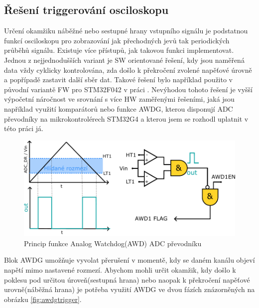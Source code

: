 \subsection{Řešení triggerování osciloskopu}
Určení okamžiku náběžné nebo sestupné hrany vstupního signálu je podstatnou funkcí osciloskopu pro zobrazování jak přechodných jevů tak periodických průběhů signálu. Existuje více přístupů, jak takovou funkci implementovat. Jednou z nejjednodušších variant je SW orientované řešení, kdy  jsou naměřená data vždy cyklicky kontrolována, zda došlo k překročení zvolené napěťové úrovně a popřípadě zastavit další sběr dat. Takové řešení bylo například použito v původní variantě FW pro STM32F042 v práci \cite{BerlingerDIP}. Nevýhodou tohoto řešení je vyšší výpočetní náročnost ve srovnání s více HW zaměřenými řešeními, jaká jsou například využití komparátorů nebo funkce AWDG, kterou disponují ADC převodníky na mikrokontrolérech STM32G4 a kterou jsem se rozhodl uplatnit v této práci já.\\

\begin{figure}[H]
	\centering
	\includegraphics[width=0.9\linewidth]{Figs/Diagrams/SVG/AWD_function.pdf}
	\caption{Princip funkce Analog Watchdog(AWD) ADC převodníku}
	\label{fig:AWD_function}
\end{figure}

Blok AWDG umožňuje vyvolat přerušení v momentě, kdy se daném kanálu objeví napětí mimo nastavené rozmezí. Abychom mohli určit okamžik, kdy došlo k poklesu pod určitou úroveň(sestupná hrana) nebo naopak k překročení napěťové urovně(náběžná hrana) je potřeba využití AWDG ve dvou fázích znázorněných na obrázku \ref{fig:awdgtrigger}.

